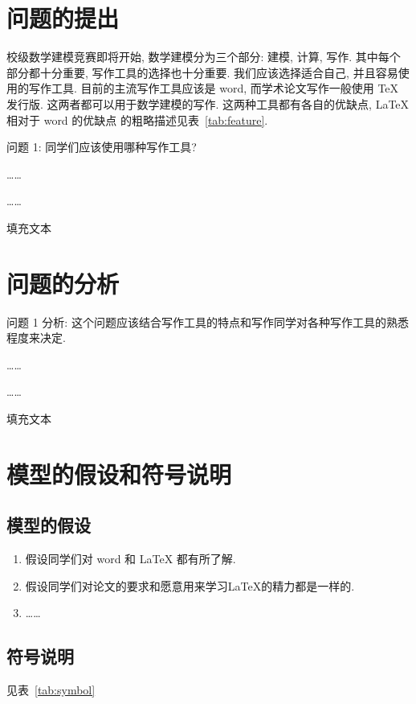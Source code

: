 \documentclass[timesfont,no-math]{JXUSTmodeling}%
\begin{document}
	
	\section{问题的提出}\label{sec:1}
	校级数学建模竞赛即将开始, 数学建模分为三个部分: 建模, 计算, 写作. 其中每个部分都十分重要, 
	写作工具的选择也十分重要. 我们应该选择适合自己, 并且容易使用的写作工具. 
	目前的主流写作工具应该是 word, 而学术论文写作一般使用 \TeX{} 发行版. 这两者都可以用于数学建模的写作.
	这两种工具都有各自的优缺点, \LaTeX{} 相对于 word 的优缺点\cite{lshort-zh} 的粗略描述见表~\ref{tab:feature}.
	
	
	问题 1: 同学们应该使用哪种写作工具?
	
	……
	
	……
	
	填充文本
	
	\lipsum[1-2]
	
	
	\section{问题的分析}\label{sec:2}
	问题 1 分析: 这个问题应该结合写作工具的特点和写作同学对各种写作工具的熟悉程度来决定.
	
	……
	
	……
	
	填充文本
	
	\lipsum[3-4]
	
	\section{模型的假设和符号说明}\label{sec:3}
	\subsection{模型的假设} \label{ssec:3.1}
	\begin{enumerate}
		\item 假设同学们对 word 和 \LaTeX{} 都有所了解.
		\item 假设同学们对论文的要求和愿意用来学习\LaTeX 的精力都是一样的.
		\item ……
		
		\noindent{}
	\end{enumerate}
	\subsection{符号说明}\label{ssec:3.2}
	见表~\ref{tab:symbol}
	
\end{document}
